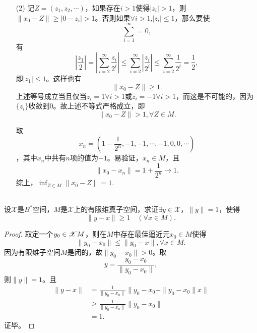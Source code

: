 \begin{exercise}
\begin{enumerate}
\item[(2)] 记$Z=(z_1,z_2,\cdots)$，如果存在$i>1$使得$|z_i|>1$，则$\|x_0-Z\|\geq|0-z_i|>1$。否则如果$\forall i>1$,$|z_i|\leq1$，那么要使
$$\sum_{i=1}^{\infty}=0,$$
有$$|\frac{z_1}{2}|=|\sum_{i=2}^{\infty}\frac{z_i}{2^i}|\leq\sum_{i=2}^{\infty}|\frac{z_i}{2^i}|\leq\sum_{i=2}^{\infty}\frac{1}{2^i}=\frac{1}{2},$$即$|z_1|\leq1$。这样也有
$$\|x_0-Z\|\geq1.$$
上述等号成立当且仅当$z_i=1\forall i>1$或$z_i=-1\forall i>1$，而这是不可能的，因为$\{z_i\}$收敛到$0$。故上述不等式严格成立，即$$\|x_0-Z\|>1,\forall Z\in M.$$

取$$x_n=(1-\frac{1}{2^n},-1,-1,\cdots,-1,0,0,\cdots)$$，其中$x_n$中共有$n$项的值为$-1$。易验证，$x_n\in M$，且
$$\|x_0-x_n\|=1+\frac{1}{2^n}\to1.$$
综上，$\inf_{Z\in M}\|x_0-Z\|=1.$
\end{enumerate}
\end{exercise}

\begin{exercise}
\hfill\\
设$\mathscr{X}$是$B^*$空间，$M$是$\mathscr{X}$上的有限维真子空间，求证$\exists y\in\mathscr{X}$，$\|y\|=1$，使得
$$\|y-x\|\geq1\quad(\forall x\in M).$$
\end{exercise}
\begin{proof}
  取定一个$y_0\in\mathscr{X}\\M$，则在$M$中存在最佳逼近元$x_0\in M$使得$$\|y_0-x_0\|\leq\|y_0-x\|,\forall x\in M.$$因为有限维子空间$M$是闭的，故$\|y_0-x_0\|>0$。取
  $$y=\frac{y_0-x_0}{\|y_0-x_0\|},$$
  则$\|y\|=1$。且
  \begin{align*}
  \|y-x\|&=\frac{1}{\|y_0-x_0\|}\|y_0-x_0-\|y_0-x_0\|x\|\\
  &\geq\frac{1}{\|y_0-x_0\|}\|y_0-x_0\|\\
  &=1.
  \end{align*} 
  证毕。 
\end{proof}




